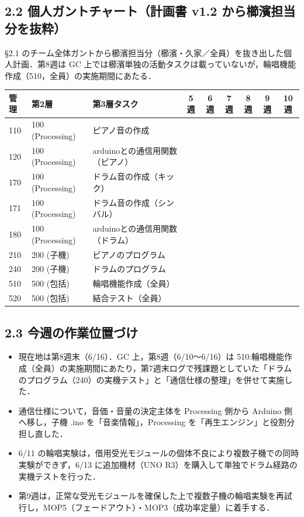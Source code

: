 \documentclass[a4paper,11pt]{ltjsarticle}
\providecommand{\％}{\%}
\begin{document}
\endgroup

\subsection*{2.2 個人ガントチャート（計画書 v1.2 から櫛濱担当分を抜粋）}

§2.1 のチーム全体ガントから櫛濱担当分（櫛濱・久家／全員）を抜き出した個人計画．第8週は GC 上では櫛濱単独の活動タスクは載っていないが，輪唱機能作成（510，全員）の実施期間にあたる．

\begin{longtable}{|p{0.9cm}|p{2.0cm}|p{6.0cm}|c|c|c|c|c|c|}
\hline
\rowcolor[gray]{0.9}
管理 & 第2層 & 第3層タスク & 5週 & 6週 & 7週 & 8週 & 9週 & 10週 \\
\hline
110 & 100 (Processing) & ピアノ音の作成 & \cellcolor{ganttCell} & & \cellcolor{ganttCell} & & & \\
\hline
120 & 100 (Processing) & arduinoとの通信用関数（ピアノ） & \cellcolor{ganttCell} & & & & & \\
\hline
170 & 100 (Processing) & ドラム音の作成（キック） & & \cellcolor{ganttCell} & & & & \\
\hline
171 & 100 (Processing) & ドラム音の作成（シンバル） & & \cellcolor{ganttCell} & & & & \\
\hline
180 & 100 (Processing) & arduinoとの通信用関数（ドラム） & & \cellcolor{ganttCell} & & & & \\
\hline
210 & 200 (子機) & ピアノのプログラム & \cellcolor{ganttCell} & & & & & \\
\hline
240 & 200 (子機) & ドラムのプログラム & & \cellcolor{ganttCell} & & & & \\
\hline
510 & 500 (包括) & 輪唱機能作成（全員） & & & \cellcolor{ganttCell} & \cellcolor{ganttCell} & & \\
\hline
520 & 500 (包括) & 結合テスト（全員） & & & & & \cellcolor{ganttCell} & \cellcolor{ganttCell} \\
\hline
\end{longtable}

\subsection*{2.3 今週の作業位置づけ}

\begin{itemize}
    \item 現在地は第8週末（6/16）．GC 上，第8週（6/10〜6/16）は 510:輪唱機能作成（全員）の実施期間にあたり，第7週末ログで残課題としていた「ドラムのプログラム（240）の実機テスト」と「通信仕様の整理」を併せて実施した．
    \item 通信仕様について，音価・音量の決定主体を Processing 側から Arduino 側へ移し，子機 .ino を「音楽情報」，Processing を「再生エンジン」と役割分担し直した．
    \item 6/11 の輪唱実験は，借用受光モジュールの個体不良により複数子機での同時実験ができず，6/13 に追加機材（UNO R3）を購入して単独でドラム経路の実機テストを行った．
    \item 第9週は，正常な受光モジュールを確保した上で複数子機の輪唱実験を再試行し，MOP5（フェードアウト）・MOP3（成功率定量）に着手する．
\end{itemize}
\end{document}
